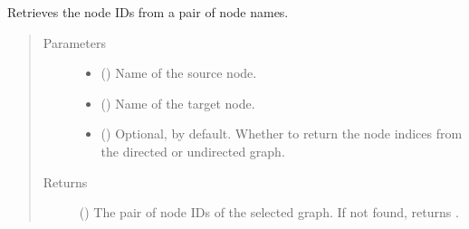 \documentclass[letterpaper,10pt,english]{sphinxmanual}
\begin{document}
\begin{fulllineitems}
\begin{fulllineitems}
\begin{description}
\end{description}

\end{fulllineitems}


\begin{fulllineitems}
\label{\detokenize{main:pypath.main.PyPath.get_node_pair}}
Retrieves the node IDs from a pair of node names.
\begin{quote}\begin{description}
\item[{Parameters}] \leavevmode\begin{itemize}
\item {} 
 () \textendash{} Name of the source node.

\item {} 
 () \textendash{} Name of the target node.

\item {} 
 () \textendash{} Optional,  by default. Whether to return the node
indices from the directed or undirected graph.

\end{itemize}

\item[{Returns}] \leavevmode
() \textendash{} The pair of node IDs of the selected graph.
If not found, returns .

\end{description}\end{quote}

\end{fulllineitems}


\begin{fulllineitems}
\label{\detokenize{main:pypath.main.PyPath.get_nodes}}
\end{fulllineitems}


\end{fulllineitems}
\end{document}
